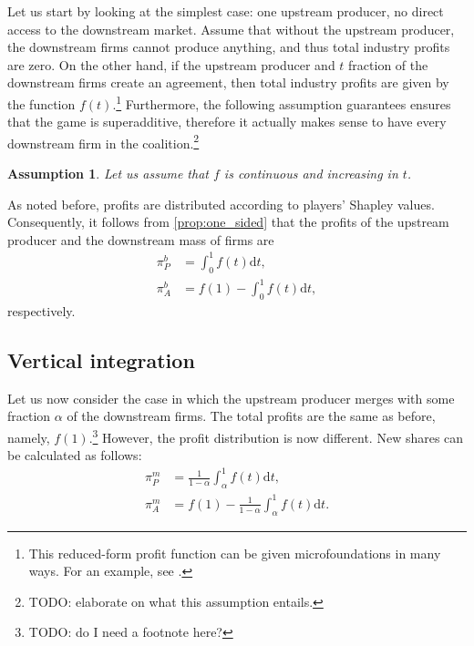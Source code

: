 \documentclass[a4paper]{article}
\newtheorem{assumption}{Assumption}
\newcommand{\dt}{\mathrm{d}t}
\begin{document}
Let us start by looking at the simplest case: one upstream producer, no direct access to the downstream market.
Assume that without the upstream producer, the downstream firms cannot produce anything, and thus total industry profits are zero.
On the other hand, if the upstream producer and $t$ fraction of the downstream firms create an agreement, then total industry profits are given by the function $f(t)$.\footnote{
    This reduced-form profit function can be given microfoundations in many ways.
    For an example, see \textcite{stancsics2023hybrid}.
}
Furthermore, the following assumption guarantees ensures that the game is superadditive, therefore it actually makes sense to have every downstream firm in the coalition.\footnote{
    TODO: elaborate on what this assumption entails.
}
\begin{assumption}
    Let us assume that $f$ is continuous and increasing in $t$.
\end{assumption}

As noted before, profits are distributed according to players' Shapley values.
Consequently, it follows from \cref{prop:one_sided} that the profits of the upstream producer and the downstream mass of firms are
\begin{align*}
    \pi_P^b & = \int_0^1 f(t) \dt, \\
    \pi_A^b & = f(1) - \int_0^1 f(t) \dt,
\end{align*}
respectively.


\subsection{Vertical integration}

Let us now consider the case in which the upstream producer merges with some fraction $\alpha$ of the downstream firms.
The total profits are the same as before, namely, $f(1)$.\footnote{
    TODO: do I need a footnote here?
}
However, the profit distribution is now different.
New shares can be calculated as follows:
\begin{align}
    \pi_{P}^m & = \frac{1}{1 - \alpha} \int_\alpha^1 f(t) \dt, \\
    \pi_{A}^m & = f(1) - \frac{1}{1 - \alpha} \int_\alpha^1 f(t) \dt .
\end{align}
\end{document}

